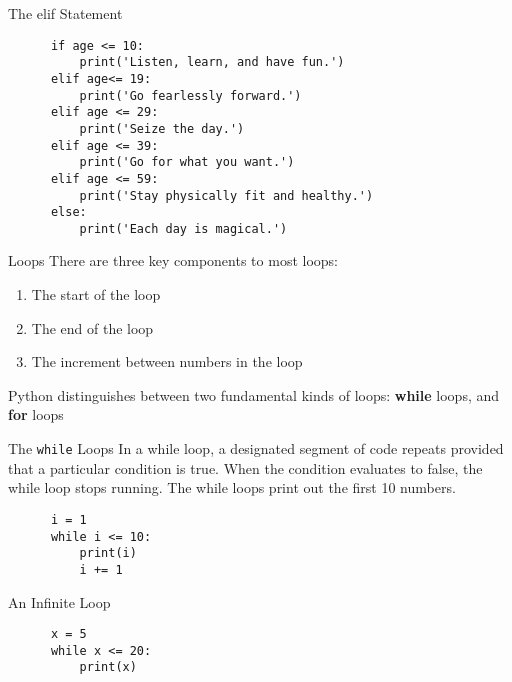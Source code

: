 \documentclass[../main.tex]{subfiles}
\begin{document}
\begin{frame}[fragile]{The elif Statement}
  \begin{code}{}
    \begin{lstlisting}
      if age <= 10:
          print('Listen, learn, and have fun.')
      elif age<= 19:
          print('Go fearlessly forward.')
      elif age <= 29:
          print('Seize the day.')
      elif age <= 39:
          print('Go for what you want.')
      elif age <= 59:
          print('Stay physically fit and healthy.')
      else:
          print('Each day is magical.')
    \end{lstlisting}
  \end{code}
\end{frame}

\begin{frame}{Loops}
  There are three key components to most loops:
  
  \begin{enumerate} \justifying
  \item The start of the loop
  \item The end of the loop
  \item The increment between numbers in the loop
  \end{enumerate}
  
Python distinguishes between two fundamental kinds of loops: \textbf{while} loops, and \textbf{for} loops
\end{frame}

\begin{frame}[fragile]{The \texttt{while} Loops}
  In a while loop, a designated segment of code repeats provided that a particular condition is true. When the condition evaluates to false, the while loop stops running. The while loops print out the first 10 numbers.

  \begin{code}{}
    \begin{lstlisting}
      i = 1
      while i <= 10:
          print(i)
          i += 1
    \end{lstlisting}
  \end{code}

  \begin{code}{An Infinite Loop}
    \begin{lstlisting}
      x = 5
      while x <= 20:
          print(x)
    \end{lstlisting}
  \end{code}
\end{frame}
\end{document}
